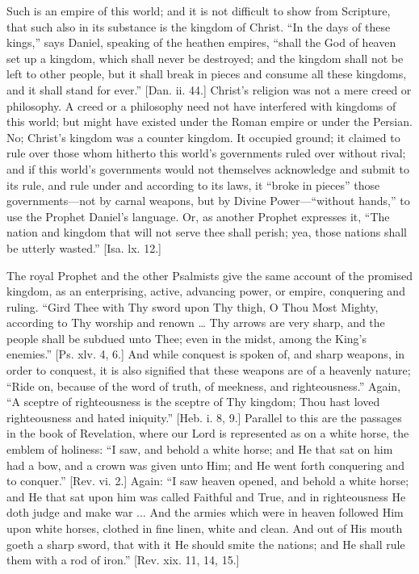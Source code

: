 Such is an empire of this world; and it is not difficult to show
from Scripture, that such also in its substance is the kingdom of
Christ. ``In the days of these kings,'' says Daniel, speaking
of the heathen empires, ``shall the God of heaven set up a
kingdom, which shall never be destroyed; and the kingdom shall not be
left to other people, but it shall break in pieces and consume all
these kingdoms, and it shall stand for ever.'' [Dan. ii. 44.]
Christ's religion was not a mere creed or philosophy. A creed or a
philosophy need not have interfered with kingdoms of this world; but
might have existed under the Roman empire or under the Persian. No;
Christ's kingdom was a counter kingdom. It occupied ground; it claimed
to rule over those whom hitherto this world's governments ruled over
without rival; and if this world's governments would not themselves
acknowledge and submit to its rule, and rule under and according to
its laws, it ``broke in pieces'' those governments—not by
carnal weapons, but by Divine Power—``without hands,'' to
use the Prophet Daniel's language. Or, as another Prophet expresses
it, ``The nation and kingdom that will not serve thee shall
perish; yea, those nations shall be utterly wasted.'' [Isa. lx.
12.]

The royal Prophet and the other Psalmists give the same account of
the promised kingdom, as an enterprising, active, advancing power, or
empire, conquering and ruling. ``Gird Thee with Thy sword upon Thy
thigh, O Thou Most Mighty, according to Thy worship and renown … Thy
arrows are very sharp, and the people shall be subdued unto Thee; even
in the midst, among the King's enemies.'' [Ps. xlv. 4, 6.] And
while conquest is spoken of, and sharp weapons, in order to conquest,
it is also signified that these weapons are of a heavenly nature;
``Ride on, because of the word of truth, of meekness, and
righteousness.'' Again, ``A sceptre of righteousness is the
sceptre of Thy kingdom; Thou hast loved righteousness and hated
iniquity.'' [Heb. i. 8, 9.] Parallel to this are the passages in
the book of Revelation, where our Lord is represented as on a white
horse, the emblem of holiness: ``I saw, and behold a white horse;
and He that sat on him had a bow, and a crown was given unto Him; and
He went forth conquering and to conquer.'' [Rev. vi. 2.] Again:
``I saw heaven opened, and behold a white horse; and He that sat
upon him was called Faithful and True, and in righteousness He doth
judge and make war ... And the armies which were in heaven followed
Him upon white horses, clothed in fine linen, white and clean. And out
of His mouth goeth a sharp sword, that with it He should smite the
nations; and He shall rule them with a rod of iron.'' [Rev. xix.
11, 14, 15.]

